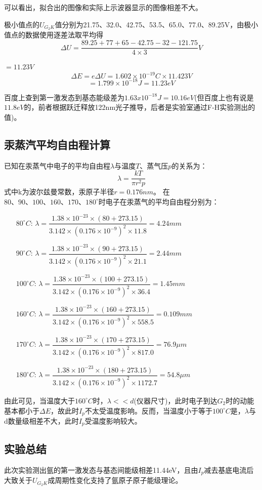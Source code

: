 \documentclass[UEF8]{ctexart}
\begin{document}
\begin{multicols}{2}
可以看出，拟合出的图像和实际上示波器显示的图像相差不大。

极小值点的$U_{G_{2}K}$值分别为21.75、32.0、42.75、53.5、65.0、77.0、89.25V，由极小值点的数据使用逐差法取平均得$$\Delta{U}=\dfrac{89.25+77+65-42.75-32-121.75}{4\times3}V$$

$=11.23V$
$$\Delta{E}=e\Delta{U}={1.602}\times{10^{-19}}C\times{11.423V}$$
$$=1.799\times10^{-18}J=11.23eV$$

百度上查到第一激发态到基态能级差为$1.63x10^{-18}J=10.16eV$(但百度上也有说是$11.8eV$的，前者根据跃迁释放122nm光子推导，后者是实验室通过F-H实验测出的值)。

\subsection{汞蒸汽平均自由程计算}
已知在汞蒸气中电子的平均自由程$\lambda$与温度$T$、蒸气压$p$的关系为：
$$\lambda=\dfrac{kT}{\pi{r^2}p}$$
式中k为波尔兹曼常数，汞原子半径$r=0.176nm$。
在$80、90、100、160、170、180^\circ$时电子在汞蒸气的平均自由程分别为：
\begin{enumerate}
	\item[$80^\circ{C}$:] $\lambda=\dfrac{1.38\times10^{-23}\times(80+273.15)}{3.142\times(0.176\times10^{-9})^2\times{11.8}}=4.24mm$
	\item[$90^\circ{C}$:] $\lambda=\dfrac{1.38\times10^{-23}\times(90+273.15)}{3.142\times(0.176\times10^{-9})^2\times{21.1}}=2.44mm$
	\item[$100^\circ{C}$:] $\lambda=\dfrac{1.38\times10^{-23}\times(100+273.15)}{3.142\times(0.176\times10^{-9})^2\times{36.4}}=1.45mm$
	\item[$160^\circ{C}$:] $\lambda=\dfrac{1.38\times10^{-23}\times(160+273.15)}{3.142\times(0.176\times10^{-9})^2\times{558.5}}=0.109mm$
	\item[$170^\circ{C}$:] $\lambda=\dfrac{1.38\times10^{-23}\times(170+273.15)}{3.142\times(0.176\times10^{-9})^2\times{817.0}}=76.9\mu{m}$
	\item[$180^\circ{C}$:] $\lambda=\dfrac{1.38\times10^{-23}\times(180+273.15)}{3.142\times(0.176\times10^{-9})^2\times{1172.7}}=54.8\mu{m}$
\end{enumerate}

由此可见，当温度大于$160^\circ{C}$时，$\lambda<<d$(仪器尺寸)，此时电子到达$G_{2}$时的动能基本都小于$\Delta{E}$，故此时$I_{p}$不太受温度影响。反而，当温度小于等于$100^\circ{C}$是，$\lambda$与d数量级相差不大，此时$I_{p}$受温度影响较大。

\subsection{实验总结}
此次实验测出氩的第一激发态与基态间能级相差11.44eV，且由$I_{p}$减去基底电流后大致关于$U_{G_{2}K}$成周期性变化支持了氩原子原子能级理论。


\end{multicols}
\end{document}
